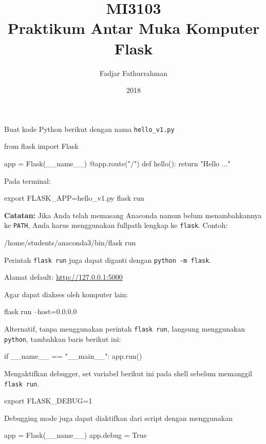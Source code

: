 \documentclass[a4paper,11pt]{extarticle}
\title{
MI3103 \\
Praktikum Antar Muka Komputer\\
Flask}
\author{Fadjar Fathurrahman}
\date{2018}
\begin{document}
\maketitle

Buat kode Python berikut dengan nama \texttt{hello\_v1.py}
\begin{pythoncode}
from flask import Flask

app = Flask(__name__)
@app.route("/")
def hello():
    return "Hello ..."
\end{pythoncode}

Pada terminal:
\begin{textcode}
export FLASK_APP=hello_v1.py
flask run
\end{textcode}

\textbf{Catatan:} Jika Anda telah memasang \textsf{Anaconda} namun
belum menambahkannya ke \texttt{PATH}, Anda harus menggunakan
fullpath lengkap ke \texttt{flask}. Contoh:
\begin{textcode}
/home/students/anaconda3/bin/flask run
\end{textcode}

Perintah \texttt{flask run} juga dapat diganti dengan \texttt{python -m flask}.

Alamat default: \url{http://127.0.0.1:5000}

Agar dapat diakses oleh komputer lain:
\begin{textcode}
flask run --host=0.0.0.0
\end{textcode}

Alternatif, tanpa menggunakan perintah \texttt{flask run}, langsung menggunakan
\texttt{python}, tambahkan baris berikut ini:
\begin{pythoncode}
if __name__ == "__main__":
    app.run()
\end{pythoncode}

Mengaktifkan debugger, set variabel berikut ini pada shell sebelum
memanggil \texttt{flask run}.

\begin{textcode}
export FLASK_DEBUG=1
\end{textcode}

Debugging mode juga dapat diaktifkan dari script dengan menggunakan
\begin{pythoncode}
app = Flask(__name__)
app.debug = True
\end{pythoncode}
\end{document}

